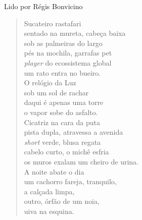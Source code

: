 Lido por Régis Bonvicino

\begin{verse}
Sucateiro rastafari\\
sentado na mureta, cabeça baixa\\
sob as palmeiras do largo\\
pés na mochila, garrafas pet\\[5pt]
\emph{player} do ecossistema global\\
um rato entra no bueiro.\\
O relógio da Luz\\
sob um sol de rachar\\[5pt]
daqui é apenas uma torre\\
o vapor sobe do asfalto.\\
Cicatriz na cara da puta\\
pista dupla, atravessa a avenida\\[5pt]
\emph{short} verde, blusa regata\\
cabelo curto, o michê esfria\\
os muros exalam um cheiro de urina.\\
A noite abate o dia\\[5pt]
um cachorro fareja, tranquilo,\\
a calçada limpa,\\
outro, órfão de um noia,\\
uiva na esquina.
\end{verse}

\pagebreak

